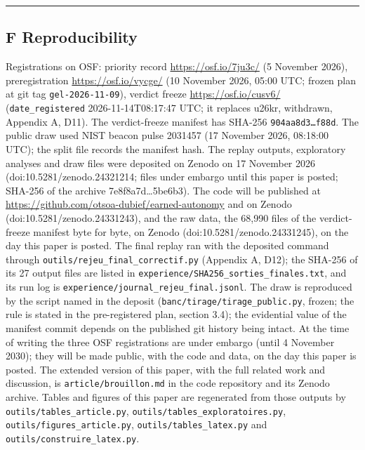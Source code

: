 \begin{center}\rule{0.5\linewidth}{0.5pt}\end{center}

\subsection{F Reproducibility}\label{f-reproducibility}

Registrations on OSF: priority record \url{https://osf.io/7ju3c/} (5 November 2026), preregistration \url{https://osf.io/vycge/} (10 November 2026, 05:00 UTC; frozen plan at git tag \texttt{gel-2026-11-09}), verdict freeze \url{https://osf.io/cusv6/} (\texttt{date\_\allowbreak{}registered} 2026-11-14T08:17:47 UTC; it replaces u26kr, withdrawn, Appendix A, D11). The verdict-freeze manifest has SHA-256 \texttt{904aa8d3…f88d}. The public draw used NIST beacon pulse 2031457 (17 November 2026, 08:18:00 UTC); the split file records the manifest hash. The replay outputs, exploratory analyses and draw files were deposited on Zenodo on 17 November 2026 (doi:10.5281/zenodo.24321214; files under embargo until this paper is posted; SHA-256 of the archive 7e8f8a7d\ldots5be6b3). The code will be published at \url{https://github.com/otsoa-dubief/earned-autonomy} and on Zenodo (doi:10.5281/zenodo.24331243), and the raw data, the 68,990 files of the verdict-freeze manifest byte for byte, on Zenodo (doi:10.5281/zenodo.24331245), on the day this paper is posted. The final replay ran with the deposited command through \texttt{outils/\allowbreak{}rejeu\_\allowbreak{}final\_\allowbreak{}correctif.\allowbreak{}py} (Appendix A, D12); the SHA-256 of its 27 output files are listed in \texttt{experience/\allowbreak{}SHA256\_\allowbreak{}sorties\_\allowbreak{}finales.\allowbreak{}txt}, and its run log is \texttt{experience/\allowbreak{}journal\_\allowbreak{}rejeu\_\allowbreak{}final.\allowbreak{}jsonl}. The draw is reproduced by the script named in the deposit (\texttt{banc/\allowbreak{}tirage/\allowbreak{}tirage\_\allowbreak{}public.\allowbreak{}py}, frozen; the rule is stated in the pre-registered plan, section 3.4); the evidential value of the manifest commit depends on the published git history being intact. At the time of writing the three OSF registrations are under embargo (until 4 November 2030); they will be made public, with the code and data, on the day this paper is posted. The extended version of this paper, with the full related work and discussion, is \texttt{article/\allowbreak{}brouillon.\allowbreak{}md} in the code repository and its Zenodo archive. Tables and figures of this paper are regenerated from those outputs by \texttt{outils/\allowbreak{}tables\_\allowbreak{}article.\allowbreak{}py}, \texttt{outils/\allowbreak{}tables\_\allowbreak{}exploratoires.\allowbreak{}py}, \texttt{outils/\allowbreak{}figures\_\allowbreak{}article.\allowbreak{}py}, \texttt{outils/\allowbreak{}tables\_\allowbreak{}latex.\allowbreak{}py} and \texttt{outils/\allowbreak{}construire\_\allowbreak{}latex.\allowbreak{}py}.
